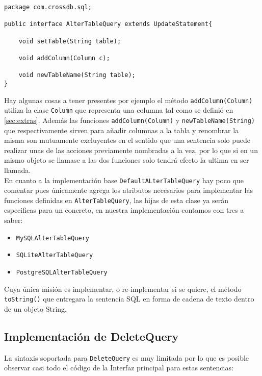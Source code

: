 \begin{lstlisting}[title=interfaz AlterTableQuery]
package com.crossdb.sql;

public interface AlterTableQuery extends UpdateStatement{
	
	void setTable(String table);
	
	void addColumn(Column c);
	
	void newTableName(String table);
}
\end{lstlisting}
Hay algunas cosas a tener presentes por ejemplo el método \verb=addColumn(Column)= utiliza la clase \verb=Column= que representa una columna tal como se definió en \ref{sec:extras}. Además las funciones \verb=addColumn(Column)= y \verb=newTableName(String)= que respectivamente sirven para añadir columnas a la tabla y renombrar la misma son mutuamente excluyentes en el sentido que una sentencia solo puede realizar unas de las acciones previamente nombradas a la vez, por lo que si en un mismo objeto se llamase a las dos funciones solo tendrá efecto la ultima en ser llamada.\\

En cuanto a la implementación base \verb=DefaultALterTableQuery= hay poco que comentar pues únicamente agrega los atributos necesarios para implementar las funciones definidas en \verb=AlterTableQuery=, las hijas de esta clase ya serán especificas para un \dd concreto, en nuestra implementación contamos con tres a saber:
\begin{itemize}
\item \verb=MySQLAlterTableQuery=
\item \verb=SQLiteAlterTableQuery=
\item \verb=PostgreSQLAlterTableQuery=
\end{itemize}
Cuya única misión es implementar, o re-implementar si se quiere, el método \verb=toString()= que entregara la sentencia SQL en forma de cadena de texto dentro de un objeto String.




\subsection{Implementación de DeleteQuery}
La sintaxis soportada para \verb=DeleteQuery= es muy limitada por lo que es posible observar casi todo el código de la Interfaz principal para estas sentencias:

